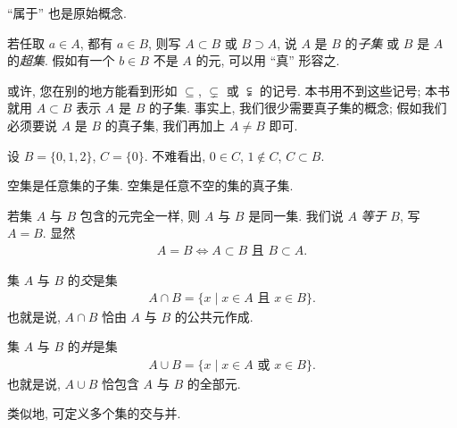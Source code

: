 \begin{remark}
    ``属于'' 也是原始概念.
\end{remark}

\begin{definition}
    若任取 $a \in A$, 都有 $a \in B$,
    则写 $A \subset B$ 或 $B \supset A$,
    说 $A$ 是 $B$ 的\emph{子集}%
    或 $B$ 是 $A$ 的\emph{超集}.
    假如有一个 $b \in B$ 不是 $A$ 的元,
    可以用 ``真'' 形容之.
\end{definition}

\begin{remark}
    或许, 您在别的地方能看到形如
    $\subseteq$, $\subsetneq$ 或 $\subsetneqq$ 的记号.
    本书用不到这些记号;
    本书就用 $A \subset B$ 表示 $A$ 是 $B$ 的子集.
    事实上, 我们很少需要真子集的概念;
    假如我们必须要说 $A$ 是 $B$ 的真子集,
    我们再加上 $A \neq B$ 即可.
\end{remark}

\begin{example}
    设 $B = \{ 0,1,2 \}$, $C = \{ 0 \}$.
    不难看出, $0 \in C$, $1 \notin C$, $C \subset B$.
\end{example}

\begin{remark}
    空集是任意集的子集.
    空集是任意不空的集的真子集.
\end{remark}

\begin{definition}
    若集 $A$ 与 $B$ 包含的元完全一样,
    则 $A$ 与 $B$ 是同一集.
    我们说 $A$ \emph{等于} $B$, 写 $A = B$.
    显然
    \begin{align*}
        A = B
        \iff \text{$A \subset B$ 且 $B \subset A$}.
    \end{align*}
\end{definition}

\begin{definition}
    集 $A$ 与 $B$ 的\emph{交}是集
    \begin{align*}
        A \cap B = \{ x \mid \text{$x \in A$ 且 $x \in B$} \}.
    \end{align*}
    也就是说, $A \cap B$ 恰由 $A$ 与 $B$ 的公共元作成.

    集 $A$ 与 $B$ 的\emph{并}是集
    \begin{align*}
        A \cup B = \{ x \mid \text{$x \in A$ 或 $x \in B$} \}.
    \end{align*}
    也就是说, $A \cup B$ 恰包含 $A$ 与 $B$ 的全部元.

    类似地, 可定义多个集的交与并.
\end{definition}

